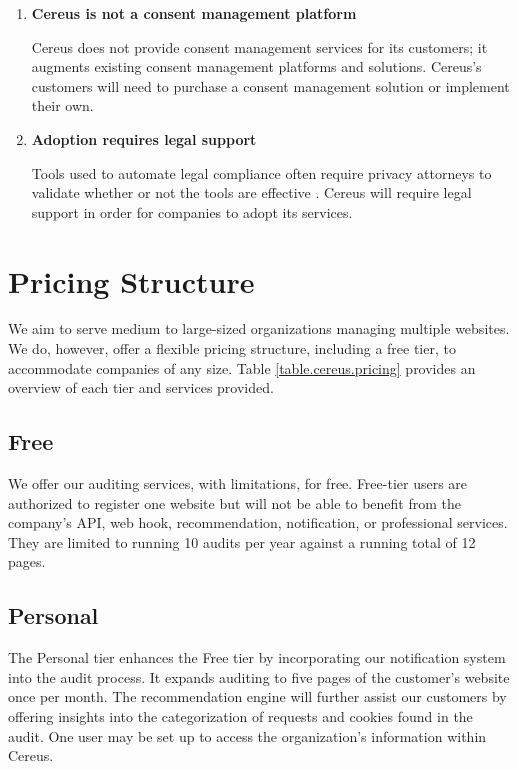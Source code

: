 \begin{enumerate}

  \item \textbf{Cereus is not a consent management platform}

  Cereus does not provide consent management services for its customers; it augments existing consent management platforms and solutions. Cereus's customers will need to purchase a consent management solution or implement their own.

  \item \textbf{Adoption requires legal support}

  Tools used to automate legal compliance often require privacy attorneys to validate whether or not the tools are effective \cite{bloomlaw.2019}. Cereus will require legal support in order for companies to adopt its services.

\end{enumerate}

\section{Pricing Structure}

We aim to serve medium to large-sized organizations managing multiple websites. We do, however, offer a flexible pricing structure, including a free tier, to accommodate companies of any size. Table \ref{table.cereus.pricing} provides an overview of each tier and services provided.

\subsection{Free}

We offer our auditing services, with limitations, for free. Free-tier users are authorized to register one website but will not be able to benefit from the company's API, web hook, recommendation, notification, or professional services. They are limited to running 10 audits per year against a running total of 12 pages.

\subsection{Personal}

The Personal tier enhances the Free tier by incorporating our notification system into the audit process. It expands auditing to five pages of the customer's website once per month. The recommendation engine will further assist our customers by offering insights into the categorization of requests and cookies found in the audit. One user may be set up to access the organization's information within Cereus.


